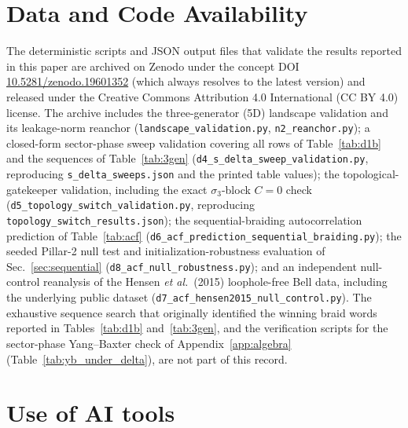 \documentclass[aps,pra,twocolumn,superscriptaddress,longbibliography,floatfix,nofootinbib]{revtex4-2}
\begin{document}
\section*{Data and Code Availability}

The deterministic scripts and JSON output files that validate the
results reported in this paper are archived on Zenodo under the
concept DOI
\href{https://doi.org/10.5281/zenodo.19601352}{10.5281/zenodo.19601352}
(which always resolves to the latest version) and released under the
Creative Commons Attribution 4.0 International (CC BY 4.0) license.
The archive includes the three-generator (5D) landscape validation
and its leakage-norm reanchor (\texttt{landscape\_validation.py},
\texttt{n2\_reanchor.py}); a closed-form sector-phase sweep validation
covering all rows of Table~\ref{tab:d1b} and the sequences of
Table~\ref{tab:3gen}
(\texttt{d4\_s\_delta\_sweep\_validation.py}, reproducing
\texttt{s\_delta\_sweeps.json} and the printed table values); the topological-gatekeeper validation,
including the exact $\sigma_3$-block $C=0$ check
(\texttt{d5\_topology\_switch\_validation.py}, reproducing
\texttt{topology\_switch\_results.json}); the sequential-braiding
autocorrelation prediction of Table~\ref{tab:acf}
(\texttt{d6\_acf\_prediction\_sequential\_braiding.py}); the seeded
Pillar-2 null test and initialization-robustness evaluation of
Sec.~\ref{sec:sequential}
(\texttt{d8\_acf\_null\_robustness.py}); and an
independent null-control reanalysis of the Hensen \emph{et al.}\
(2015) loophole-free Bell data, including the underlying public
dataset (\texttt{d7\_acf\_hensen2015\_null\_control.py}). The
exhaustive sequence search that originally identified the winning
braid words reported in Tables~\ref{tab:d1b} and~\ref{tab:3gen}, and
the verification scripts for the sector-phase Yang--Baxter check of
Appendix~\ref{app:algebra} (Table~\ref{tab:yb_under_delta}), are not
part of this record.

\section*{Use of AI tools}
\end{document}
